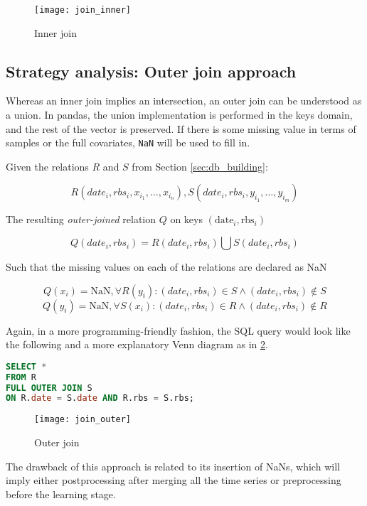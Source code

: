 \begin{figure}[H]
	\centering
	\texttt{[image: join\_inner]}
	\caption{Inner join}
	\label{fig:inner_join}
\end{figure}

 

\subsection{Strategy analysis: Outer join approach}

Whereas an inner join implies an intersection, an outer join can be understood as a union. In pandas, the union implementation is performed in the keys domain, and the rest of the vector is preserved.  If there is some missing value in terms of samples or the full covariates, \texttt{NaN} will be used to fill in.

Given the relations $R$ and $S$ from Section \ref{sec:db_building}:

$$R(date_i, rbs_i, x_{i_1}, \ldots, x_{i_n}), S(date_i, rbs_i, y_{i_1}, \ldots, y_{i_m})$$

The resulting \emph{outer-joined} relation $Q$ on keys $(\text{date}_i, \text{rbs}_i)$

$$Q(date_i, rbs_i) = R(date_i, rbs_i) \bigcup S(date_i, rbs_i)$$

Such that the missing values on each of the relations are declared as NaN

$$Q(x_i) = \text{NaN} , \forall R(y_i) : (date_i, rbs_i) \in S \land (date_i, rbs_i) \notin S$$
$$Q(y_i) = \text{NaN} , \forall S(x_i) : (date_i, rbs_i) \in R \land (date_i, rbs_i) \notin R$$

Again, in a more programming-friendly fashion, the SQL query would look like the following and a more explanatory Venn diagram as in  \ref{fig:outer_join}.

\begin{lstlisting}[language=SQL]
SELECT *
FROM R
FULL OUTER JOIN S
ON R.date = S.date AND R.rbs = S.rbs;
\end{lstlisting}


\begin{figure}[H]
	\centering
	\texttt{[image: join\_outer]}
	\caption{Outer join}
	\label{fig:outer_join}
\end{figure}

The drawback of this approach is related to its insertion of NaNs, which will imply either postprocessing after merging all the time series or preprocessing before the learning stage.

